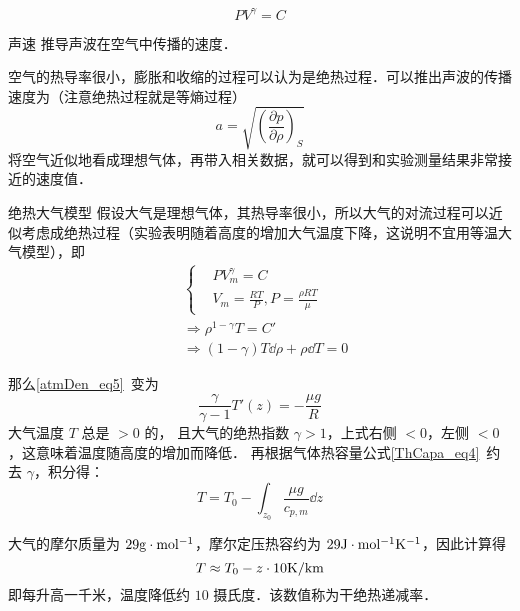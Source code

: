 \begin{equation}
P V^\gamma = C
\end{equation}

\begin{example}{声速}
推导声波在空气中传播的速度．

空气的热导率很小，膨胀和收缩的过程可以认为是绝热过程．可以推出声波的传播速度为（注意绝热过程就是等熵过程）
\begin{equation}
a=\sqrt{\left(\frac{\partial p}{\partial \rho}\right)_S}
\end{equation}
将空气近似地看成理想气体，再带入相关数据，就可以得到和实验测量结果非常接近的速度值．
\end{example}
\begin{example}{绝热大气模型}
假设大气是理想气体，其热导率很小，所以大气的对流过程可以近似考虑成绝热过程（实验表明随着高度的增加大气温度下降，这说明不宜用等温大气模型），即
\begin{equation}
\begin{aligned}
&\begin{cases}
&PV_m^\gamma=C\\
&V_m=\frac{RT}{P},P=\frac{\rho R T}{\mu}
\end{cases}
\\
&\Rightarrow \rho^{1-\gamma}T=C'\\
&\Rightarrow (1-\gamma)T\dd \rho+\rho\dd T=0  
\end{aligned}
\end{equation}

那么\autoref{atmDen_eq5}~变为
\begin{equation}
\frac{\gamma}{\gamma-1}T'(z)=-\frac{\mu g}{R}
\end{equation}
大气温度 $T$ 总是 $>0$ 的， 且大气的绝热指数 $\gamma>1$，上式右侧 $<0$，左侧 $<0$，这意味着温度随高度的增加而降低． 再根据气体热容量公式\autoref{ThCapa_eq4}~约去 $\gamma$，积分得：
\begin{equation}\label{Adiab_eq6}
T=T_0-\int_{z_0}\frac{\mu g}{c_{p,m}} \dd z 
\end{equation}

大气的摩尔质量为 $29 \rm{g\cdot mol^{-1}}$，摩尔定压热容约为 $29 \rm{J\cdot mol^{-1}K^{-1}}$，因此计算得
\begin{equation}
T\approx T_0-z\cdot 10 \rm{K/km}
\end{equation}
即每升高一千米，温度降低约 $10$ 摄氏度．该数值称为干绝热递减率．
\end{example}
